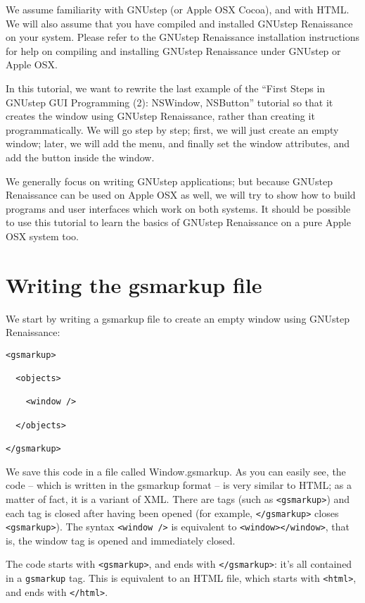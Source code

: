 \documentclass[a4paper]{article}
\begin{document}
We assume familiarity with GNUstep (or Apple OSX Cocoa), and with
HTML.  We will also assume that you have compiled and installed
GNUstep Renaissance on your system.  Please refer to the GNUstep
Renaissance installation instructions for help on compiling and
installing GNUstep Renaissance under GNUstep or Apple OSX.

In this tutorial, we want to rewrite the last example of the ``First
Steps in GNUstep GUI Programming (2): NSWindow, NSButton'' tutorial so
that it creates the window using GNUstep Renaissance, rather than
creating it programmatically.  We will go step by step; first, we will
just create an empty window; later, we will add the menu, and finally
set the window attributes, and add the button inside the window.

We generally focus on writing GNUstep applications; but because
GNUstep Renaissance can be used on Apple OSX as well, we will try to
show how to build programs and user interfaces which work on both
systems.  It should be possible to use this tutorial to learn the
basics of GNUstep Renaissance on a pure Apple OSX system too.

\section{Writing the gsmarkup file}
We start by writing a gsmarkup file to create an empty window using
GNUstep Renaissance:
\begin{verbatim}
<gsmarkup>

  <objects>

    <window />

  </objects>

</gsmarkup>
\end{verbatim}
We save this code in a file called Window.gsmarkup.  As you can easily
see, the code -- which is written in the gsmarkup format -- is very
similar to HTML; as a matter of fact, it is a variant of XML.  There
are tags (such as \texttt{<gsmarkup>}) and each tag is closed after
having been opened (for example, \texttt{</gsmarkup>} closes
\texttt{<gsmarkup>}).  The syntax \texttt{<window />} is equivalent
to \texttt{<window></window>}, that is, the window tag is opened and
immediately closed.

The code starts with \texttt{<gsmarkup>}, and ends with
\texttt{</gsmarkup>}: it's all contained in a \texttt{gsmarkup} tag. 
This is equivalent to an HTML file, which starts with \texttt{<html>},
and ends with \texttt{</html>}.
\end{document}
